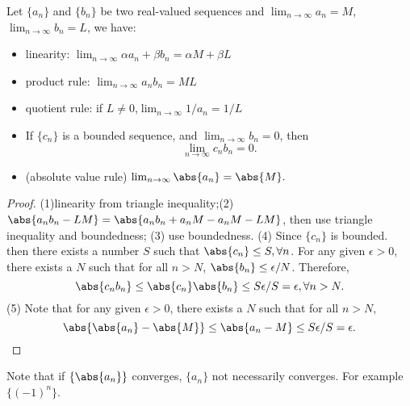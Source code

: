 \begin{refsection}
\begin{lemma}\cite[40]{johnsonbaugh2010foundations}\label{ch:sequences-series:th:algebraOfLimits}
Let $\{a_n\}$ and $\{b_n\}$ be two real-valued sequences and $\lim_{n\rightarrow \infty} a_n = M$, $\lim_{n\rightarrow \infty} b_n = L$, we have: \cite{johnsonbaugh2010foundations}
\begin{itemize}
    \item linearity: $\lim_{n \rightarrow \infty} \alpha a_n + \beta b_n = \alpha M + \beta L$
    \item product rule: $\lim_{n \rightarrow \infty} a_n b_n = ML$ 
    \item quotient rule: if $L\neq 0$,$ \lim_{n \rightarrow \infty} 1/a_n = 1/L $
    \item If $\{c_n\}$ is a bounded sequence, and $\lim_{n\to \infty} b_n = 0$, then
    $$\lim_{n\to \infty} c_n b_n = 0.$$
    \item (absolute value rule) $\lim_{n\to\infty} \abs{a_n} = \abs{M}.$
\end{itemize}
\end{lemma}
\begin{proof}
(1)linearity from triangle inequality;(2) $\abs{a_nb_n-LM} = \abs{a_nb_n +a_nM - a_nM-LM}$, then use triangle inequality and boundedness; (3) use boundedness. (4) Since $\{c_n\}$ is bounded. then there exists a number $S$ such that $\abs{c_n}\leq S, \forall n$. For any given $\epsilon > 0$, there exists a $N$ such that for all $n>N$, $\abs{b_n}\leq \epsilon/N$. Therefore, 
$$\abs{c_nb_n} \leq \abs{c_n}\abs{b_n} \leq S\epsilon/S = \epsilon, \forall n > N.$$
(5) Note that for any given $\epsilon > 0$, there exists a $N$ such that for all $n>N$, 
$$\abs{\abs{a_n}-\abs{M}} \leq \abs{a_n - M}\leq  S\epsilon/S = \epsilon.$$
\end{proof}

\begin{note}
Note that if $\{\abs{a_n}\}$ converges, $\{a_n\}$ not necessarily converges. For example $\{(-1)^n\}$.	
\end{note}



\end{refsection}
